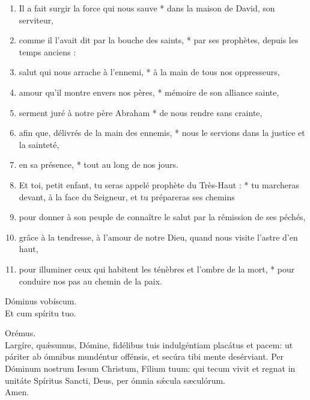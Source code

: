 \documentclass[twoside]{article}
\begin{document}
\begin{paracol}[1]{2}
\begin{enumerate}[wide, itemsep=0mm, labelwidth=!, labelindent=0pt, label=\color{gregoriocolor}\theenumi]
\item Il a fait surgir la force qui nous sauve *
dans la maison de David, son serviteur,

\item comme il l'avait dit par la bouche des saints, *
par ses prophètes, depuis les temps anciens :

\item salut qui nous arrache à l'ennemi, *
à la main de tous nos oppresseurs,

\item amour qu'il montre envers nos pères, *
mémoire de son alliance sainte,

\item serment juré à notre père Abraham *
   de nous rendre sans crainte,

\item afin que, délivrés de la main des ennemis, *
 nous le servions dans la justice et la sainteté,
 
\item en sa présence, * tout au long de nos jours.

\item Et toi, petit enfant, tu seras appelé
   prophète du Très-Haut : *
tu marcheras devant, à la face du Seigneur,
   et tu prépareras ses chemins

\item pour donner à son peuple de connaître le salut
par la rémission de ses péchés,

\item grâce à la tendresse, à l'amour de notre Dieu,
quand nous visite l'astre d'en haut,

\item pour illuminer ceux qui habitent les ténèbres
   et l'ombre de la mort, *
pour conduire nos pas
   au chemin de la paix.
\end{enumerate}

\switchcolumn*

\vv Dóminus vobíscum. \\
\rr Et cum spíritu tuo.

Orémus.\\
Largíre, quǽsumus, Dómine, fidélibus tuis indulgéntiam placátus et pacem: ut páriter ab ómnibus mundéntur offénsis, et secúra tibi mente desérviant.
Per Dóminum nostrum Iesum Christum, Fílium tuum: qui tecum vivit et regnat in unitáte Spíritus Sancti, Deus, per ómnia sǽcula sæculórum. \\
\rr Amen.

\switchcolumn


\end{paracol}
\end{document}
